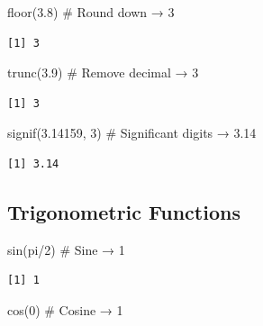 \documentclass[
  letterpaper,
  DIV=11,
  numbers=noendperiod]{scrreprt}
\newenvironment{Shaded}{\begin{snugshade}}{\end{snugshade}}
\newcommand{\CommentTok}[1]{\textcolor[rgb]{0.37,0.37,0.37}{#1}}
\newcommand{\DecValTok}[1]{\textcolor[rgb]{0.68,0.00,0.00}{#1}}
\newcommand{\FloatTok}[1]{\textcolor[rgb]{0.68,0.00,0.00}{#1}}
\newcommand{\FunctionTok}[1]{\textcolor[rgb]{0.28,0.35,0.67}{#1}}
\newcommand{\NormalTok}[1]{\textcolor[rgb]{0.00,0.23,0.31}{#1}}
\newcommand{\SpecialCharTok}[1]{\textcolor[rgb]{0.37,0.37,0.37}{#1}}
\begin{document}
\begin{Shaded}
\begin{Highlighting}[]
\FunctionTok{floor}\NormalTok{(}\FloatTok{3.8}\NormalTok{)             }\CommentTok{\# Round down → 3}
\end{Highlighting}
\end{Shaded}

\begin{verbatim}
[1] 3
\end{verbatim}

\begin{Shaded}
\begin{Highlighting}[]
\FunctionTok{trunc}\NormalTok{(}\FloatTok{3.9}\NormalTok{)             }\CommentTok{\# Remove decimal → 3}
\end{Highlighting}
\end{Shaded}

\begin{verbatim}
[1] 3
\end{verbatim}

\begin{Shaded}
\begin{Highlighting}[]
\FunctionTok{signif}\NormalTok{(}\FloatTok{3.14159}\NormalTok{, }\DecValTok{3}\NormalTok{)     }\CommentTok{\# Significant digits → 3.14}
\end{Highlighting}
\end{Shaded}

\begin{verbatim}
[1] 3.14
\end{verbatim}

\subsection{Trigonometric Functions}\label{trigonometric-functions}

\begin{Shaded}
\begin{Highlighting}[]
\FunctionTok{sin}\NormalTok{(pi}\SpecialCharTok{/}\DecValTok{2}\NormalTok{)              }\CommentTok{\# Sine → 1}
\end{Highlighting}
\end{Shaded}

\begin{verbatim}
[1] 1
\end{verbatim}

\begin{Shaded}
\begin{Highlighting}[]
\FunctionTok{cos}\NormalTok{(}\DecValTok{0}\NormalTok{)                 }\CommentTok{\# Cosine → 1}
\end{Highlighting}
\end{Shaded}
\end{document}
